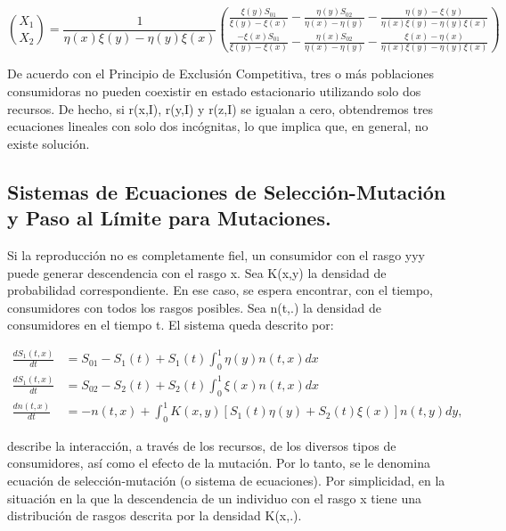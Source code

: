 \documentclass[letterpaper]{article}
\begin{document}
{        \begin{equation}
            \binom{X_1}{X_2}=\frac{1}{\eta(x)\xi(y)-\eta(y)\xi(x)}\binom{\frac{\xi(y)S_{01}}{\xi(y)-\xi(x)}-\frac{\eta(y)S_{02}}{\eta(x)-\eta(y)}-\frac{\eta(y)-\xi(y)}{\eta(x)\xi(y)-\eta(y)\xi(x)}}{\frac{-\xi(x)S_{01}}{\xi(y)-\xi(x)}-\frac{\eta(x)S_{02}}{\eta(x)-\eta(y)}-\frac{\xi(x)-\eta(x)}{\eta(x)\xi(y)-\eta(y)\xi(x)}}
        \end{equation}

        \normalsize{De acuerdo con el Principio de Exclusión Competitiva, tres o más poblaciones consumidoras no pueden coexistir en estado estacionario utilizando solo dos recursos. De hecho, si r(x,I), r(y,I) y r(z,I) se igualan a cero, obtendremos tres ecuaciones lineales con solo dos incógnitas, lo que implica que, en general, no existe solución.}\\


        
        \subsection{Sistemas de Ecuaciones de Selección-Mutación y Paso al Límite para Mutaciones.}

        \normalsize{Si la reproducción no es completamente fiel, un consumidor con el rasgo yyy puede generar descendencia con el rasgo x. Sea K(x,y) la densidad de probabilidad correspondiente. En ese caso, se espera encontrar, con el tiempo, consumidores con todos los rasgos posibles. Sea n(t,.) la densidad de consumidores en el tiempo t. El sistema queda descrito por:}

        \begin{equation}
            \begin{split}
                \frac{d S_1(t,x)}{dt}&=S_{01}-S_1(t)+S_1(t)\int_{0}^{1}\eta(y)n(t,x)dx\\
               \frac{d S_1(t,x)}{dt}&=S_{02}-S_2(t)+S_2(t)\int_{0}^{1}\xi(x)n(t,x)dx\\
              \frac{d n(t,x)}{dt}&=-n(t,x)+\int_{0}^{1}K(x,y)[S_1(t)\eta(y)+S_2(t)\xi(x)]n(t,y)dy,
            \end{split}
        \end{equation}

        \normalsize{describe la interacción, a través de los recursos, de los diversos tipos de consumidores, así como el efecto de la mutación. Por lo tanto, se le denomina ecuación de selección-mutación (o sistema de ecuaciones). Por simplicidad, en la situación en la que la descendencia de un individuo con el rasgo x tiene una distribución de rasgos descrita por la densidad K(x,.).}\\

}
\end{document}
